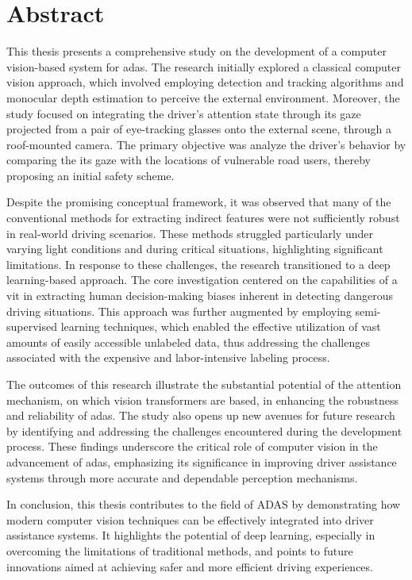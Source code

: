 \thispagestyle{empty}
\section*{Abstract}
\vspace{0.5cm}
This thesis presents a comprehensive study on the development of a computer 
vision-based system for \acf{adas}. The research 
initially explored a classical computer vision approach, which involved 
employing detection and tracking algorithms and monocular depth estimation
to perceive the external environment. Moreover, the study focused on 
integrating the driver’s attention state through its gaze projected from a pair 
of eye-tracking glasses onto the external scene, through a roof-mounted camera.
The primary objective was analyze the driver's behavior by comparing the 
its gaze with the locations of vulnerable road users, thereby proposing 
an initial safety scheme.

Despite the promising conceptual framework, it was observed that many of the 
conventional methods for extracting indirect features were not sufficiently 
robust in real-world driving scenarios. These methods struggled particularly 
under varying light conditions and during critical situations, highlighting 
significant limitations. In response to these challenges, the research 
transitioned to a deep learning-based approach. The core investigation centered 
on the capabilities of a \acf{vit} in extracting human decision-making 
biases inherent in detecting dangerous driving situations.
This approach was further augmented by 
employing semi-supervised learning techniques, which enabled the effective 
utilization of vast amounts of easily accessible unlabeled data, thus 
addressing the challenges associated with the expensive and labor-intensive 
labeling process.

The outcomes of this research illustrate the substantial potential of 
the attention mechanism, on which vision transformers are based, in enhancing 
the robustness 
and reliability of \acs{adas}. The study also opens up new avenues for future 
research by identifying and addressing the challenges encountered during the 
development process. These findings underscore the critical role of computer 
vision in the advancement of \acs{adas}, emphasizing its significance in improving 
driver assistance systems through more accurate and dependable perception 
mechanisms.

In conclusion, this thesis contributes to the field of ADAS by demonstrating 
how modern computer vision techniques can be effectively integrated into driver 
assistance systems. It highlights the potential of deep 
learning, especially in overcoming the limitations of traditional methods, and 
points to future innovations aimed at achieving safer and more 
efficient driving experiences.

\afterpage{\blankpage}
